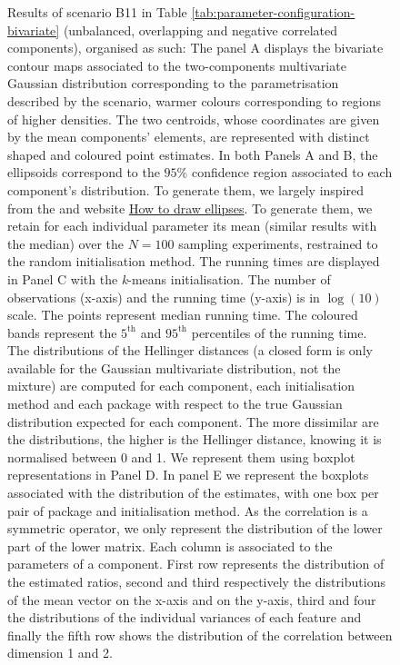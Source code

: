 \begin{figure}
\caption{Results of scenario B11 in Table \ref{tab:parameter-configuration-bivariate} (unbalanced, overlapping and negative correlated components),  organised as such:
The panel A displays the bivariate contour maps associated to the two-components multivariate Gaussian distribution corresponding to the parametrisation described by the scenario, warmer colours corresponding to regions of higher densities. The two centroids, whose coordinates are given by the mean components' elements, are represented with distinct shaped and coloured point estimates.
In both Panels A and B, the ellipsoids correspond to the $95\%$ confidence region associated to each component's distribution. To generate them, we largely inspired from the  and website \href{https://cookierobotics.com/007/}{How to draw ellipses}. To generate them, we retain for each individual parameter its mean (similar results with the median) over the $N=100$ sampling experiments, restrained to the random initialisation method.
The running times are displayed in Panel C with the \textit{k}-means initialisation. The number of observations (x-axis) and the running time (y-axis) is in $\log(10)$ scale. The points represent median running time. The coloured bands represent the $5^{\text{th}}$ and $95^{\text{th}}$ percentiles of the running time.
The distributions of the Hellinger distances (a closed form is only available for the Gaussian multivariate distribution, not the mixture) are computed for each component, each initialisation method and each package with respect to the true Gaussian distribution expected for each component. The more dissimilar are the distributions, the higher is the Hellinger distance, knowing it is normalised between 0 and 1. We represent them using boxplot representations in Panel D.
In panel E we represent the boxplots associated with the distribution of the estimates, with one box per pair of package and initialisation method. As the correlation is a symmetric operator, we only represent the distribution of the lower part of the lower matrix. Each column is associated to the parameters of a component. First row represents the distribution of the estimated ratios, second and third respectively the distributions of the mean vector on the x-axis and on the y-axis, third and four the distributions of the individual variances of each feature and finally the fifth row shows the distribution of the correlation between dimension 1 and 2.}\label{fig:multivariate-overlapping-unbalanced-negative-correlated}
\end{figure}

